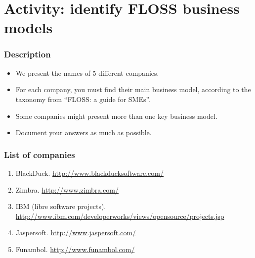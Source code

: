 
\section{Activity: identify FLOSS business models}

\begin{frame}
\frametitle{Description}
\begin{itemize}
  \item We present the names of 5 different companies.
  \item For each company, you must find their main business model, according
to the taxonomy from ``FLOSS: a guide for SMEs''.
  \item Some companies might present more than one key business model.
  \item Document your answers as much as possible.
\end{itemize}
\end{frame}

\begin{frame}
 \frametitle{List of companies}
  \begin{enumerate}
\item BlackDuck.
   \url{http://www.blackducksoftware.com/}
 \item Zimbra.
   \url{http://www.zimbra.com/}
 \item IBM (libre software projects).
   \footnotesize{\url{http://www.ibm.com/developerworks/views/opensource/projects.jsp}}
 \item Jaspersoft.
   \url{http://www.jaspersoft.com/}
 \item Funambol.
   \url{http://www.funambol.com/}
  \end{enumerate}

\end{frame}


